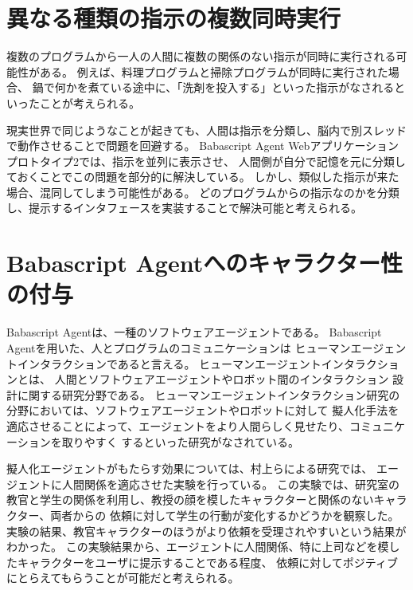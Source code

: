 \section{異なる種類の指示の複数同時実行}\label{ux7570ux306aux308bux7a2eux985eux306eux6307ux793aux306eux8907ux6570ux540cux6642ux5b9fux884c}

複数のプログラムから一人の人間に複数の関係のない指示が同時に実行される可能性がある。
例えば、料理プログラムと掃除プログラムが同時に実行された場合、
鍋で何かを煮ている途中に、「洗剤を投入する」といった指示がなされるといったことが考えられる。

現実世界で同じようなことが起きても、人間は指示を分類し、脳内で別スレッドで動作させることで問題を回避する。
Babascript Agent
Webアプリケーションプロトタイプ2では、指示を並列に表示させ、
人間側が自分で記憶を元に分類しておくことでこの問題を部分的に解決している。
しかし、類似した指示が来た場合、混同してしまう可能性がある。
どのプログラムからの指示なのかを分類し、提示するインタフェースを実装することで解決可能と考えられる。

\section{Babascript
Agentへのキャラクター性の付与}\label{babascript-agentux3078ux306eux30adux30e3ux30e9ux30afux30bfux30fcux6027ux306eux4ed8ux4e0e}

Babascript Agentは、一種のソフトウェアエージェントである。 Babascript
Agentを用いた、人とプログラムのコミュニケーションは
ヒューマンエージェントインタラクションであると言える。
ヒューマンエージェントインタラクションとは、
人間とソフトウェアエージェントやロボット間のインタラクション
設計に関する研究分野である。
ヒューマンエージェントインタラクション研究の分野においては、ソフトウェアエージェントやロボットに対して
擬人化手法を適応させることによって、エージェントをより人間らしく見せたり、コミュニケーションを取りやすく
するといった研究がなされている。

擬人化エージェントがもたらす効果については、村上らによる研究\cite{murakami}では、
エージェントに人間関係を適応させた実験を行っている。
この実験では、研究室の教官と学生の関係を利用し、教授の顔を模したキャラクターと関係のないキャラクター、両者からの
依頼に対して学生の行動が変化するかどうかを観察した。
実験の結果、教官キャラクターのほうがより依頼を受理されやすいという結果がわかった。
この実験結果から、エージェントに人間関係、特に上司などを模したキャラクターをユーザに提示することである程度、
依頼に対してポジティブにとらえてもらうことが可能だと考えられる。

